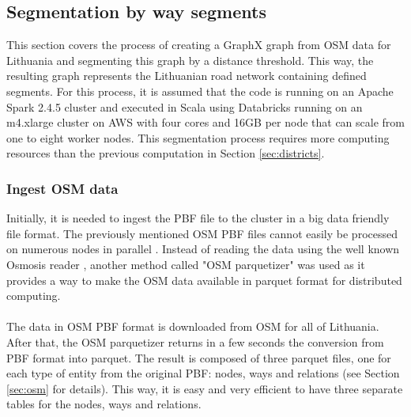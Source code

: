 \subsection{Segmentation by way segments}\label{sec:graphx}
This section covers the process of creating a GraphX graph from \ac{OSM} data for Lithuania and segmenting this graph by a distance threshold. This way, the resulting graph represents the Lithuanian road network containing defined segments. For this process, it is assumed that the code is running on an Apache Spark 2.4.5 cluster and executed in Scala using Databricks running on an m4.xlarge cluster on \ac{AWS} with four cores and 16GB per node that can scale from one to eight worker nodes. This segmentation process requires more computing resources than the previous computation in Section \ref{sec:districts}. 

\subsubsection{Ingest \ac{OSM} data}
Initially, it is needed to ingest the \ac{PBF} file to the cluster in a big data friendly file format. The previously mentioned \ac{OSM} \ac{PBF} files cannot easily be processed on numerous nodes in parallel \cite{osm-parquetizer1}. Instead of reading the data using the well known Osmosis reader \cite{osmosis}, another method called "\ac{OSM} parquetizer" \cite{osm-parquetizer} was used as it provides a way to make the \ac{OSM} data available in parquet format for distributed computing.
\\
\\
The data in \ac{OSM} \ac{PBF} format is downloaded from \ac{OSM} \cite{geofabrik} for all of Lithuania. After that, the \ac{OSM} parquetizer returns in a few seconds the conversion from \ac{PBF} format into parquet. The result is composed of three parquet files, one for each type of entity from the original \ac{PBF}: nodes, ways and relations (see Section \ref{sec:osm} for details). This way, it is easy and very efficient to have three separate tables for the nodes, ways and relations. 

